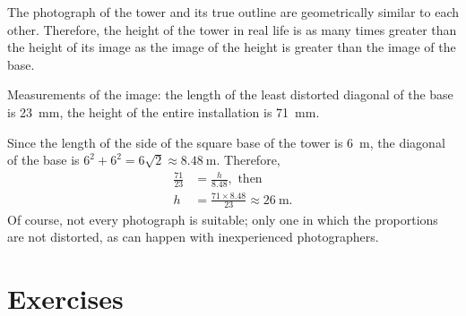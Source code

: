 \ans The photograph of the tower and its true outline are geometrically similar to each other. Therefore, the height of the tower in real life is as many times greater than the height of its image as the image of the height is greater than the image of the base.

Measurements of the image: the length of the least distorted diagonal of the base is \SI{23}{\milli\meter}, the height of the entire installation is \SI{71}{\milli\meter}.

Since the length of the side of the square base of the tower is \SI{6}{\meter}, the diagonal of the base is $6^{2} + 6^{2} = 6\sqrt{2} \approx \SI{8.48}{\meter}$. Therefore, 
\begin{align*}%
\frac{71}{23} & = \frac{h}{8.48},\,\, \text{then}\\
h & = \frac{71 \times 8.48}{23} \approx \SI{26}{\meter}.
\end{align*}
Of course, not every photograph is suitable; only one in which the proportions are not distorted, as can happen with inexperienced photographers.


\section{Exercises}


